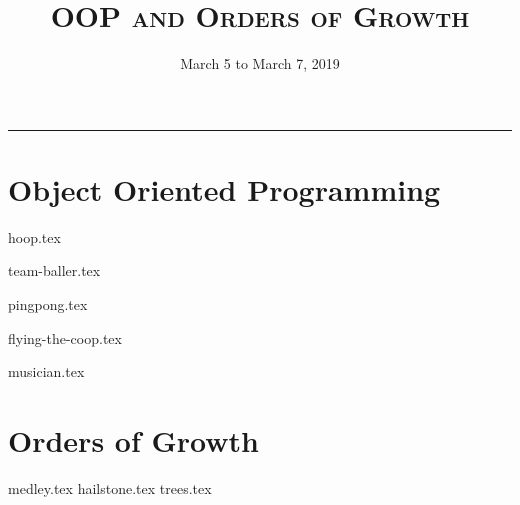 \documentclass{exam}
\title{\textsc{OOP and Orders of Growth}}
\date{March 5 to March 7, 2019}
\begin{document}
\maketitle
\rule{\textwidth}{0.15em}
\fontsize{12}{15}\selectfont

\section{Object Oriented Programming}
\begin{questions}
{hoop.tex}

{team-baller.tex}

{pingpong.tex}

{flying-the-coop.tex}

{musician.tex}

\end{questions}

\newpage
\section{Orders of Growth}
\begin{questions}
{medley.tex}
{hailstone.tex}
{trees.tex}
\end{questions}
\end{document}
